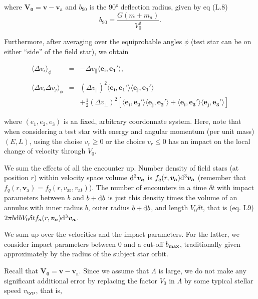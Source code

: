 \documentclass[11pt]{article}
\newcommand{\rt}{\mathrm{t}}
\newcommand{\rr}{\mathrm{r}}
\newcommand{\bv}{\boldsymbol{v}}
\newcommand{\fq}{f_{q}}
\newcommand{\ra}{\mathrm{a}}
\newcommand{\va}{v_{\ra}}
\newcommand{\dvPar}{\Delta v_{||}}
\newcommand{\dvPerp}{\Delta v_{\perp}}
\newcommand{\bva}{\boldsymbol{\va}}
\newcommand{\e}[1]{\boldsymbol{e_{#1}}}
\newcommand{\bV}[1]{\boldsymbol{V_{#1}}}
\newcommand{\rd}{{\rm{d}}}
\newcommand{\var}{v_{\ra \rr}}
\newcommand{\vat}{v_{\ra \rt}}
\begin{document}
where $\bV0= \bv-\bva$ and $b_{90}$ is the 90° deflection radius,
given by eq (L.8) 
\begin{equation}
  b_{90}=\frac{G(m+m_{a})}{V_{0}^{2}} .
  \label{eq:b90}
\end{equation}

Furthermore, after averaging over the equiprobable angles $\phi$
(test star can be on either ``side'' of the field star), we obtain

\begin{equation}
\begin{array}{ccl}
  \langle\Delta v_{i}\rangle_{\phi} & =&-\dvPar \langle\boldsymbol{e_{i}},\e1'\rangle ,\\
  {}&{}&{} \\
  \langle\Delta v_{i}\Delta v_{j}\rangle_{\phi} & = & (\Delta v_{\parallel})^{2}\langle\boldsymbol{e_{i}},\boldsymbol{e_{1}'}\rangle\langle\boldsymbol{e_{j}},\boldsymbol{e_{1}'}\rangle \\
  {}&{}&+\frac{1}{2}(\dvPerp)^{2}\left[\langle\boldsymbol{e_{i}},\e2'\rangle\langle\boldsymbol{e_{j}},\e2'\rangle+\langle\boldsymbol{e_{i}},\e3'\rangle\langle\boldsymbol{e_{j}},\e3'\rangle\right]
\end{array}
\label{eq:delta_v}
\end{equation}

where $(e_{1},e_{2},e_{3})$ is an fixed, arbitrary coordonnate system. Here, note that when considering a test star with energy and angular
momentum (per unit mass) $(E,L)$, using the choise $v_{r}\geq0$
or the choice $v_{r}\leq0$ has an impact on the local change of velocity
through $V_{0}$.

We sum the effects of all the encounter up. Number density of field
stars (at position $r$) within velocity space volume ${\rm d}^{3}\boldsymbol{v_{a}}$
is $\fq(r,\bva) \rd^{3}\bva$ (remember
that $\fq(r,\bva)= \fq(r,\var,\vat)$). The number
of encounters in a time $\delta t$ with impact parameters between
$b$ and $b+\rd b$ is just this density times the volume of an
annulus with inner radius $b$, outer radius $b+\rd b$, and length
$V_{0}\delta t$, that is (eq. L9) $2\pi b{\rm d}bV_{0}\delta tf_{a}(r,\boldsymbol{v_{a}}){\rm d}^{3}\boldsymbol{v_{a}}$.

We sum up over the velocities and the impact parameters. For the latter,
we consider impact parameters between $0$ and a cut-off $b_{{\rm max}}$,
traditionally given approximately by the radius of the subject star
orbit.

Recall that $\bV0 =\bv -\bva$.
Since we assume that $\Lambda$ is large, we do not make any significant
additional error by replacing the factor $V_{0}$ in $\Lambda$ by
some typical stellar speed $v_{{\rm typ}}$, that is,
\end{document}
